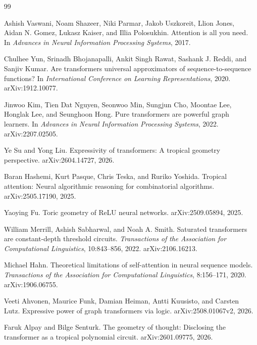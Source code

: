 \documentclass[11pt]{article}
\begin{document}
\begin{thebibliography}{99}

Ashish Vaswani, Noam Shazeer, Niki Parmar, Jakob Uszkoreit, Llion Jones, Aidan N. Gomez, Lukasz Kaiser, and Illia Polosukhin.
\newblock Attention is all you need.
\newblock In \emph{Advances in Neural Information Processing Systems}, 2017.

Chulhee Yun, Srinadh Bhojanapalli, Ankit Singh Rawat, Sashank J. Reddi, and Sanjiv Kumar.
\newblock Are transformers universal approximators of sequence-to-sequence functions?
\newblock In \emph{International Conference on Learning Representations}, 2020.
\newblock arXiv:1912.10077.

Jinwoo Kim, Tien Dat Nguyen, Seonwoo Min, Sungjun Cho, Moontae Lee, Honglak Lee, and Seunghoon Hong.
\newblock Pure transformers are powerful graph learners.
\newblock In \emph{Advances in Neural Information Processing Systems}, 2022.
\newblock arXiv:2207.02505.

Ye Su and Yong Liu.
\newblock Expressivity of transformers: A tropical geometry perspective.
\newblock arXiv:2604.14727, 2026.

Baran Hashemi, Kurt Pasque, Chris Teska, and Ruriko Yoshida.
\newblock Tropical attention: Neural algorithmic reasoning for combinatorial algorithms.
\newblock arXiv:2505.17190, 2025.

Yaoying Fu.
\newblock Toric geometry of ReLU neural networks.
\newblock arXiv:2509.05894, 2025.

William Merrill, Ashish Sabharwal, and Noah A. Smith.
\newblock Saturated transformers are constant-depth threshold circuits.
\newblock \emph{Transactions of the Association for Computational Linguistics}, 10:843--856, 2022.
\newblock arXiv:2106.16213.

Michael Hahn.
\newblock Theoretical limitations of self-attention in neural sequence models.
\newblock \emph{Transactions of the Association for Computational Linguistics}, 8:156--171, 2020.
\newblock arXiv:1906.06755.

Veeti Ahvonen, Maurice Funk, Damian Heiman, Antti Kuusisto, and Carsten Lutz.
\newblock Expressive power of graph transformers via logic.
\newblock arXiv:2508.01067v2, 2026.

Faruk Alpay and Bilge Senturk.
\newblock The geometry of thought: Disclosing the transformer as a tropical polynomial circuit.
\newblock arXiv:2601.09775, 2026.


\end{thebibliography}
\end{document}

